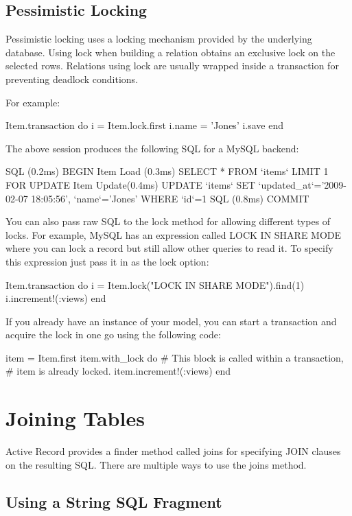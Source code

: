 \documentclass[10pt]{book}
\newenvironment{code}{%
  \scriptsize
    \verbatim
}{%
    \endverbatim
    \newline
}
\begin{document}
\subsection{ Pessimistic Locking}

Pessimistic locking uses a locking mechanism provided by the underlying database. Using lock when building a relation obtains an exclusive lock on the selected rows. Relations using lock are usually wrapped inside a transaction for preventing deadlock conditions.

For example:
\begin{code}
Item.transaction do
  i = Item.lock.first
  i.name = 'Jones'
  i.save
end
\end{code}

The above session produces the following SQL for a MySQL backend:
\begin{code}
SQL (0.2ms)   BEGIN
Item Load (0.3ms) 
SELECT * FROM `items` LIMIT 1 FOR UPDATE
Item Update(0.4ms)
UPDATE `items` 
SET `updated_at`='2009-02-07 18:05:56', `name`='Jones' 
WHERE `id`=1
SQL (0.8ms)   COMMIT
\end{code}

You can also pass raw SQL to the lock method for allowing different types of locks. For example, MySQL has an expression called LOCK IN SHARE MODE  where you can lock a record but still allow other queries to read it.  To specify this expression just pass it in as the lock option:
\begin{code}
Item.transaction do
  i = Item.lock("LOCK IN SHARE MODE").find(1)
  i.increment!(:views)
end
\end{code}

If you already have an instance of your model, you can start a  transaction and acquire the lock in one go using the following code:
\begin{code}
item = Item.first
item.with_lock do
  # This block is called within a transaction,
  # item is already locked.
  item.increment!(:views)
end
\end{code}

\section{ Joining Tables}

Active Record provides a finder method called joins for specifying JOIN clauses on the resulting SQL. There are multiple ways to use the joins method.

\subsection{ Using a String SQL Fragment}
\end{document}
